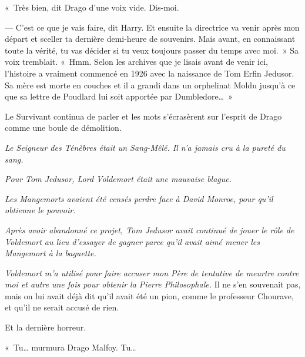 «~Très bien, dit Drago d'une voix vide.
Dis-moi.

--- C'est ce que je vais faire, dit Harry.
Et ensuite la directrice va venir après mon départ et sceller ta dernière demi-heure de souvenirs.
Mais avant, en connaissant toute la vérité, tu vas décider si tu veux toujours passer du temps avec moi.~»
Sa voix tremblait.
«~Hmm. Selon les archives que je lisais avant de venir ici, l'histoire a vraiment commencé en 1926 avec la naissance de Tom Erfin Jedusor.
Sa mère est morte en couches et il a grandi dans un orphelinat Moldu jusqu'à ce que sa lettre de Poudlard lui soit apportée par Dumbledore…~»

Le Survivant continua de parler et les mots s'écrasèrent sur l'esprit de Drago comme une boule de démolition.

\emph{Le Seigneur des Ténèbres était un Sang-Mêlé.
Il n'a jamais cru à la pureté du sang.}

\emph{Pour Tom Jedusor, Lord Voldemort était une mauvaise blague.}

\emph{Les Mangemorts avaient été censés perdre face à David Monroe, pour qu'il obtienne le pouvoir.}

\emph{Après avoir abandonné ce projet, Tom Jedusor avait continué de jouer le rôle de Voldemort au lieu d'essayer de gagner parce qu'il avait aimé mener les Mangemort à la baguette.}

\emph{Voldemort m'a utilisé pour faire accuser mon Père de tentative de meurtre contre moi et autre une fois pour obtenir la Pierre Philosophale.} Il ne s'en souvenait pas, mais on lui avait déjà dit qu'il avait été un pion, comme le professeur Chourave, et qu'il ne serait accusé de rien.

Et la dernière horreur.

«~Tu… murmura Drago Malfoy. Tu…


